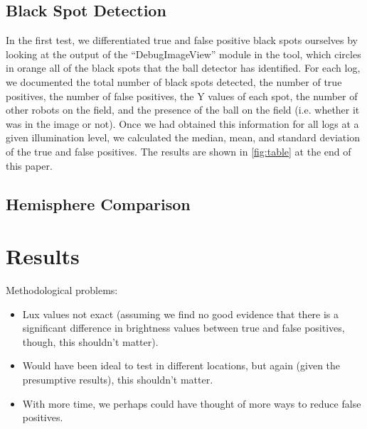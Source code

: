 \documentclass[11pt, twocolumn]{article}
\begin{document}
\subsection{Black Spot Detection}
In the first test, we differentiated true and false positive black spots ourselves by looking at the output of the ``DebugImageView'' module in the tool, which circles in orange all of the black spots that the ball detector has identified. For each log, we documented the total number of black spots detected, the number of true positives, the number of false positives, the Y values of each spot, the number of other robots on the field, and the presence of the ball on the field (i.e. whether it was in the image or not). Once we had obtained this information for all logs at a given illumination level, we calculated the median, mean, and standard deviation of the true and false positives. The results are shown in \ref{fig:table} at the end of this paper.
\subsection{Hemisphere Comparison}
\section{Results}
Methodological problems:
\begin{itemize}
\item Lux values not exact (assuming we find no good evidence that there is a significant difference in brightness values between true and false positives, though, this shouldn't matter).
\item Would have been ideal to test in different locations, but again (given the presumptive results), this shouldn't matter.
\item With more time, we perhaps could have thought of more ways to reduce false positives.
\end{itemize}
\end{document}
